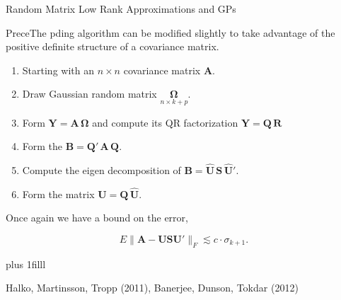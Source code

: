 \documentclass[11pt,ignorenonframetext,]{beamer}
\providecommand{\tightlist}{%
  \setlength{\itemsep}{0pt}\setlength{\parskip}{0pt}}
\newcommand{\vvfill}{\vskip0pt plus 1filll}
\begin{document}
\begin{frame}{Random Matrix Low Rank Approximations and GPs}
\protect\hypertarget{random-matrix-low-rank-approximations-and-gps}{}

PreceThe pding algorithm can be modified slightly to take advantage of
the positive definite structure of a covariance matrix.

\begin{enumerate}
[1.]
\tightlist
\item
  Starting with an \(n \times n\) covariance matrix \(\symbf{A}\).
\end{enumerate}

\pause

\begin{enumerate}
[1.]
\setcounter{enumi}{1}
\tightlist
\item
  Draw Gaussian random matrix
  \(\underset{n \times k+p}{\symbf{\Omega}}\).
\end{enumerate}

\pause

\begin{enumerate}
[1.]
\setcounter{enumi}{2}
\tightlist
\item
  Form \(\symbf{Y} = \symbf{A}\,\symbf{\Omega}\) and compute its QR
  factorization \(\symbf{Y} = \symbf{Q}\,\symbf{R}\)
\end{enumerate}

\pause

\begin{enumerate}
[1.]
\setcounter{enumi}{3}
\tightlist
\item
  Form the \(\symbf{B}=\symbf{Q}'\,\symbf{A} \, \symbf{Q}\).
\end{enumerate}

\pause

\begin{enumerate}
[1.]
\setcounter{enumi}{4}
\tightlist
\item
  Compute the eigen decomposition of
  \(\symbf{B} = \symbf{\hat{U}}\,\symbf{S}\,\symbf{\hat{U}}'\).
\end{enumerate}

\pause

\begin{enumerate}
[1.]
\setcounter{enumi}{5}
\tightlist
\item
  Form the matrix \(\symbf{U} = \symbf{Q} \, \symbf{\hat{U}}\).
\end{enumerate}

\pause

Once again we have a bound on the error,

\[
  E \|\symbf{A} - \symbf{U}\symbf{S}\symbf{U}'\|_F 
\lesssim c \cdot \sigma_{k+1}. 
\]

\vvfill

\footnotesize
\begin{center}
Halko, Martinsson, Tropp (2011), Banerjee, Dunson, Tokdar (2012)
\end{center}

\end{frame}
\end{document}
